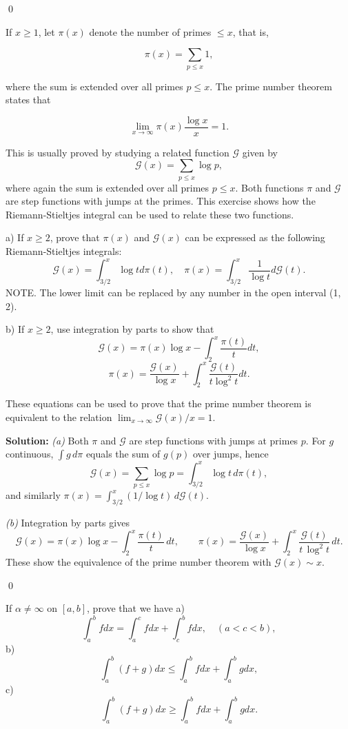 \qed
\begin{problembox}
If $x \geq 1$, let $\pi(x)$ denote the number of primes $\leq x$, that is,

\[ \pi(x) = \sum_{p \leq x} 1, \]

where the sum is extended over all primes $p \leq x$. The prime number theorem states that

\[ \lim_{x \to \infty} \pi(x) \frac{\log x}{x} = 1. \]

This is usually proved by studying a related function $\mathcal{G}$ given by
\[\mathcal{G}(x) = \sum_{p \leq x} \log p,\]
where again the sum is extended over all primes $p \leq x$. Both functions $\pi$ and $\mathcal{G}$ are step functions with jumps at the primes. This exercise shows how the Riemann-Stieltjes integral can be used to relate these two functions.

a) If $x \geq 2$, prove that $\pi(x)$ and $\mathcal{G}(x)$ can be expressed as the following Riemann-Stieltjes integrals:
\[\mathcal{G}(x) = \int_{3/2}^{x} \log t d\pi(t), \quad \pi(x) = \int_{3/2}^{x} \frac{1}{\log t} d\mathcal{G}(t).\]
NOTE. The lower limit can be replaced by any number in the open interval (1, 2).

b) If $x \geq 2$, use integration by parts to show that
\[\mathcal{G}(x) = \pi(x) \log x - \int_{2}^{x} \frac{\pi(t)}{t} dt,\]
\[\pi(x) = \frac{\mathcal{G}(x)}{\log x} + \int_{2}^{x} \frac{\mathcal{G}(t)}{t \log^{2} t} dt.\]

These equations can be used to prove that the prime number theorem is equivalent to the relation $\lim_{x \to \infty} \mathcal{G}(x)/x = 1$.
\end{problembox}

\noindent\textbf{Solution:}
\textit{(a)} Both $\pi$ and $\mathcal{G}$ are step functions with jumps at primes $p$. For $g$ continuous, $\int g\,d\pi$ equals the sum of $g(p)$ over jumps, hence
\[\mathcal{G}(x)=\sum_{p\le x}\log p=\int_{3/2}^{x} \log t\,d\pi(t),\]
and similarly $\pi(x)=\int_{3/2}^{x} (1/\log t)\,d\mathcal{G}(t)$.

\textit{(b)} Integration by parts gives
\[\mathcal{G}(x)=\pi(x)\log x-\int_2^x \frac{\pi(t)}{t}\,dt,\qquad \pi(x)=\frac{\mathcal{G}(x)}{\log x}+\int_2^x \frac{\mathcal{G}(t)}{t\,\log^2 t}\,dt.
\]
These show the equivalence of the prime number theorem with $\mathcal{G}(x)\sim x$.




\qed
\begin{problembox}
If $\alpha \neq \infty$ on $[a, b]$, prove that we have
a) \[\int_{a}^{b} f dx = \int_{a}^{c} f dx + \int_{c}^{b} f dx, \quad (a < c < b),\]
b) \[\int_{a}^{b} (f + g) dx \leq \int_{a}^{b} f dx + \int_{a}^{b} g dx,\]
c) \[\int_{a}^{b} (f + g) dx \geq \int_{a}^{b} f dx + \int_{a}^{b} g dx.\]
\end{problembox}

